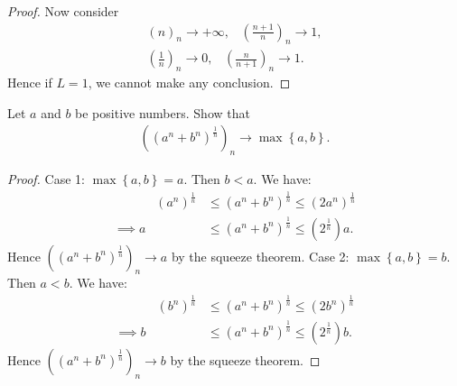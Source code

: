 \documentclass[10pt,twoside,openany]{memoir}
\begin{document}
{\begin{proof}
            Now consider
                \begin{equation*}
                \begin{split}
                    (n)_n \rightarrow +\infty, \hspace{10pt} \left(\frac{n+1}{n}\right)_n \rightarrow 1,\\
                    \left(\frac{1}{n}\right)_n \rightarrow 0, \hspace{10pt} \left(\frac{n}{n+1}\right)_n \rightarrow 1. 
                \end{split}
                \end{equation*}
            Hence if $L = 1$, we cannot make any conclusion.
        \end{proof}}
    \begin{exercise}
        Let $a$ and $b$ be positive numbers. Show that
            \begin{equation*}
            \begin{split}
                \left((a^n+b^n)^\frac{1}{n}\right)_n \rightarrow \max \left\{a,b\right\}.
            \end{split}
            \end{equation*}
    \end{exercise}
        {\color{red} \begin{proof}
            Case 1: $\max \left\{a,b\right\} = a$. Then $b < a$. We have:
                \begin{equation*}
                \begin{split}
                    \phantom{implies}(a^n)^\frac{1}{n} &\leq (a^n+b^n)^\frac{1}{n} \leq (2a^n)^\frac{1}{n} \\
                    \implies a &\leq (a^n+b^n)^\frac{1}{n} \leq (2^\frac{1}{n})a.
                \end{split}
                \end{equation*}
            Hence $\left((a^n + b^n)^\frac{1}{n}\right)_n \rightarrow a$ by the squeeze theorem. Case 2: $\max \left\{a,b\right\} = b$. Then $a < b$. We have:
                \begin{equation*}
                \begin{split}
                    \phantom{implies}(b^n)^\frac{1}{n} &\leq (a^n+b^n)^\frac{1}{n} \leq (2b^n)^\frac{1}{n} \\
                    \implies b &\leq (a^n+b^n)^\frac{1}{n} \leq (2^\frac{1}{n})b.
                \end{split}
                \end{equation*}
            Hence $\left((a^n + b^n)^\frac{1}{n}\right)_n \rightarrow b$ by the squeeze theorem.
        \end{proof}}
\end{document}
